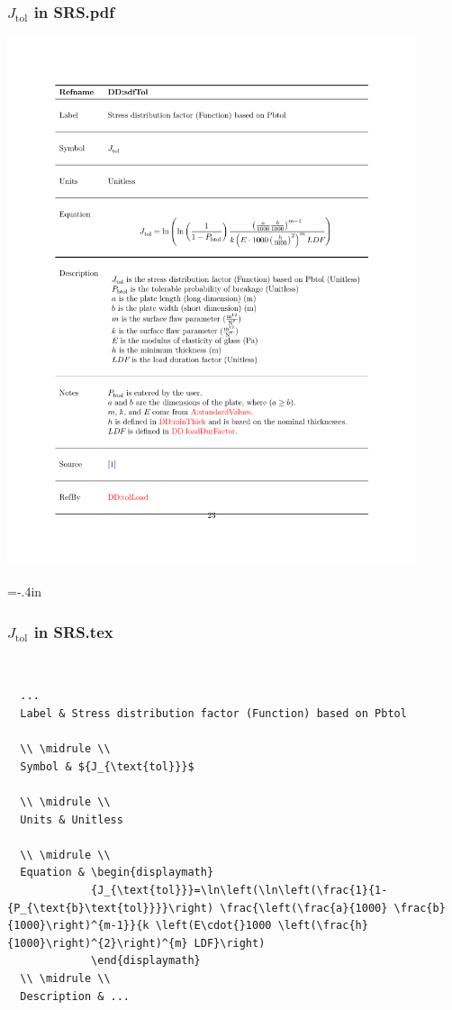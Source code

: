 \documentclass[usenames,dvipsnames]{beamer}
\begin{document}
\begin{frame}[plain]
  
  \frametitle{$J_{\mbox{tol}}$ in SRS.pdf}
  \begin{center}
  \includegraphics[width=0.9\textwidth]{Jtol_pdf.pdf}
  \end{center}
\end{frame}
\hoffset=0in %
\hoffset=-.4in %
\begin{frame}
  
  \frametitle{$J_{\mbox{tol}}$ in SRS.tex}
  ~\\
  \begin{lstlisting}
  ...
  Label & Stress distribution factor (Function) based on Pbtol
          
  \\ \midrule \\
  Symbol & ${J_{\text{tol}}}$
           
  \\ \midrule \\
  Units & Unitless
          
  \\ \midrule \\
  Equation & \begin{displaymath}
             {J_{\text{tol}}}=\ln\left(\ln\left(\frac{1}{1-{P_{\text{b}\text{tol}}}}\right) \frac{\left(\frac{a}{1000} \frac{b}{1000}\right)^{m-1}}{k \left(E\cdot{}1000 \left(\frac{h}{1000}\right)^{2}\right)^{m} LDF}\right)
             \end{displaymath}
  \\ \midrule \\
  Description & ...
  \end{lstlisting}
\end{frame}
\end{document}
